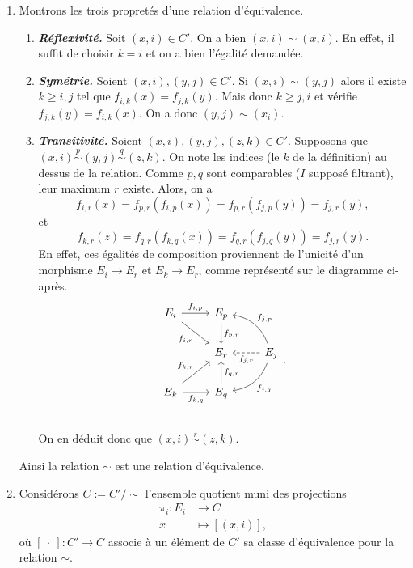 \documentclass{../../td}
\begin{document}
  \begin{enumerate}
    \item Montrons les trois propretés d'une relation d'équivalence.
      \begin{enumerate}
        \item \textbf{\textsl{\color{deepblue}Réflexivité.}}
          Soit $(x, i) \in C'$.
          On a bien $(x,i) \sim (x,i)$.
          En effet, il suffit de choisir $k = i$ et on a bien l'égalité demandée.
        \item \textbf{\textsl{\color{deepblue}Symétrie.}}
          Soient $(x, i), (y, j) \in C'$.
          Si $(x, i) \sim (y,j)$ alors il existe $k \ge i,j$ tel que $f_{i,k}(x) = f_{j,k}(y)$.
          Mais donc $k \ge j,i$ et vérifie $f_{j,k}(y) = f_{i,k}(x)$.
          On a donc $(y,j) \sim (x_i)$.
        \item \textbf{\textsl{\color{deepblue}Transitivité.}}
          Soient $(x, i), (y, j),(z,k) \in C'$.
          Supposons que $(x, i) \overset p\sim (y,j) \overset q\sim (z,k)$.
          On note les indices (le $k$ de la définition) au dessus de la relation.
          Comme $p,q$ sont comparables ($I$ supposé filtrant), leur maximum $r$ existe.
          Alors, on a \[
            f_{i,r}(x) = f_{p,r}(f_{i,p}(x)) = f_{p,r}(f_{j,p}(y)) = f_{j,r}(y)
          ,\] et \[
            f_{k,r}(z) = f_{q,r}(f_{k,q}(x)) = f_{q,r}(f_{j,q}(y)) = f_{j,r}(y)
          .\]
          En effet, ces égalités de composition proviennent de l'unicité d'un morphisme $E_i \to E_r$ et $E_k \to E_r$, comme représenté sur le diagramme ci-après.
          \[
          \begin{tikzcd}
            E_i \arrow{r}{f_{i,p}} \arrow[swap]{dr}{f_{i,r}} & E_p \arrow{d}{f_{p,r}}\\
          & E_r & E_j \arrow[swap,bend right]{ul}{f_{j,p}} \arrow[bend left]{dl}{f_{j,q}} \arrow[dashed]{l}{f_{j,r}}\\
            E_k \arrow[swap]{r}{f_{k,q}} \arrow{ur}{f_{k,r}} & E_q \arrow[swap]{u}{f_{q,r}}\\
          \end{tikzcd}
          .\]
          On en déduit donc que $(x,i) \overset r \sim (z,k)$.
      \end{enumerate}
      Ainsi la relation $\sim$ est une relation d'équivalence.
    \item
      Considérons $C := C' / \sim$ l'ensemble quotient muni des projections  
      \begin{align*}
        \pi_i: E_i &\longrightarrow C \\
        x &\longmapsto [(x,i)]
      ,\end{align*}
      où $[\:\cdot\:] : C' \to C$ associe à un élément de $C'$ sa classe d'équivalence pour la relation $\sim$.



\end{enumerate}
\end{document}
